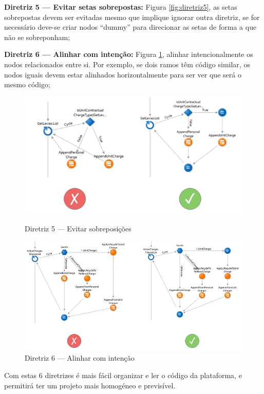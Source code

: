     \textbf{Diretriz 5 — Evitar setas sobrepostas:} Figura \ref{fig:diretriz5}, as setas sobrepostas devem ser evitadas mesmo que implique ignorar outra diretriz, se for necessário deve-se criar nodos ``dummy'' para direcionar as setas de forma a que não se sobreponham;

    \textbf{Diretriz 6 — Alinhar com intenção:} Figura \ref{fig:diretriz6}, alinhar intencionalmente os nodos relacionados entre si. Por exemplo, se dois ramos têm código similar, os nodos iguais devem estar alinhados horizontalmente para ser ver que será o mesmo código;

    \begin{figure}[htbp]
        \centering
        \begin{minipage}{.5\textwidth}
            \centering
            \includegraphics[scale=0.37]{imgs/diretrizes/5.png}
            \caption{Diretriz 5 — Evitar sobreposições}\label{fig:diretriz5}
        \end{minipage}%
        \begin{minipage}{.5\textwidth}
            \centering
            \includegraphics[scale=0.30]{imgs/diretrizes/6.png}
            \caption{Diretriz 6 — Alinhar com intenção}\label{fig:diretriz6}
        \end{minipage}
    \end{figure}

    Com estas 6 diretrizes é mais fácil organizar e ler o código da plataforma, e permitirá ter um projeto mais homogéneo e previsível\cite{outsystems-style-guide}.



